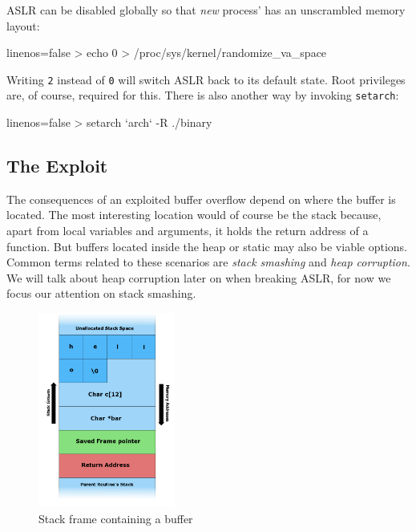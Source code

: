 \documentclass[article]{uibk}
\begin{document}
ASLR can be disabled globally so that \emph{new} process' has an unscrambled
memory layout:

\begin{code*}{linenos=false}
    > echo 0 > /proc/sys/kernel/randomize_va_space
\end{code*}

Writing \texttt{2} instead of \texttt{0} will switch ASLR back to its default
state. Root privileges are, of course, required for this. There is also another
way by invoking \texttt{setarch}:

\begin{code*}{linenos=false}
    > setarch `arch` -R ./binary
\end{code*}

\subsection{The Exploit}

The consequences of an exploited buffer overflow depend on where the buffer is
located. The most interesting location would of course be the stack because,
apart from local variables and arguments, it holds the return address of a
function. But buffers located inside the heap or static may also be viable
options. Common terms related to these scenarios are \textit{stack smashing}
and \textit{heap corruption}. We will talk about heap corruption later on when
breaking ASLR, for now we focus our attention on stack smashing.

\begin{figure}[H]
    \centering
    \includegraphics[width=0.4\textwidth]{gfx/stack_smash.png}
    \caption{Stack frame containing a buffer}
    \label{fig:stack_frame}
\end{figure}
\end{document}
